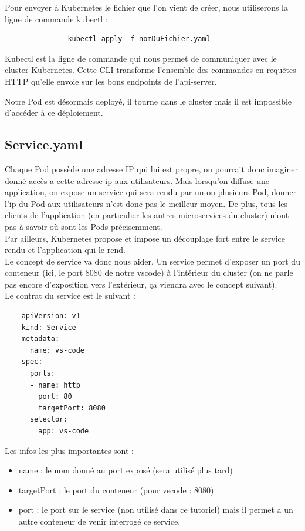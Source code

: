 \documentclass[11pt,fleqn]{book} %
\begin{document}
Pour envoyer à Kubernetes le fichier que l'on vient de créer, nous utiliserons la ligne de commande kubectl :
\begin{verbatim}
               kubectl apply -f nomDuFichier.yaml
\end{verbatim}
Kubectl est la ligne de commande qui nous permet de communiquer avec le cluster Kubernetes. Cette CLI transforme l'ensemble des commandes en requêtes HTTP qu'elle envoie sur les bons endpoints de l'api-server.\newline

Notre Pod est désormais deployé, il tourne dans le cluster mais il est impossible d'accéder à ce déploiement.
\subsection*{Service.yaml}
Chaque Pod possède une adresse IP qui lui est propre, on pourrait donc imaginer donné accès a cette adresse ip aux utilisateurs. Mais lorsqu'on diffuse une application, on expose un service qui sera rendu par un ou plusieurs Pod, donner l'ip du Pod aux utilisateurs n'est donc pas le meilleur moyen. De plus, tous les clients de l'application (en particulier les autres microservices du cluster) n'ont pas à savoir où sont les Pods précisemment. \\

Par ailleurs, Kubernetes propose et impose un découplage fort entre le service rendu et l'application qui le rend. \\ 

Le concept de service va donc nous aider. Un service permet d'exposer un port du conteneur (ici, le port 8080 de notre vscode) à l'intérieur du cluster (on ne parle pas encore d'exposition vers l'extérieur, ça viendra avec le concept suivant). \\
Le contrat du service est le suivant : 
\begin{verbatim}
    apiVersion: v1
    kind: Service
    metadata:
      name: vs-code
    spec:
      ports:
      - name: http
        port: 80
        targetPort: 8080
      selector:
        app: vs-code
\end{verbatim}
Les infos les plus importantes sont : 
\begin{itemize}
    \item name : le nom donné au port exposé (sera utilisé plus tard)
    \item targetPort : le port du conteneur (pour vscode : 8080)
    \item port : le port sur le service (non utilisé dans ce tutoriel) mais il permet a un autre conteneur de venir interrogé ce service.\\
\end{itemize}
\end{document}
